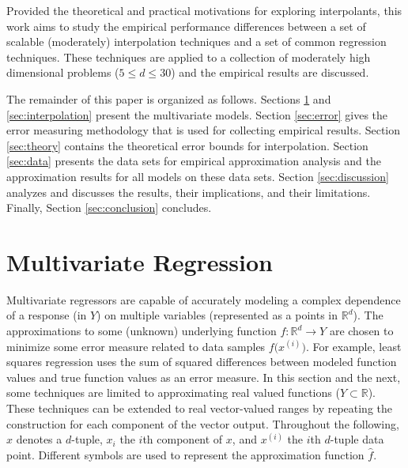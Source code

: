 \documentclass[smallextended,final]{svjour3}       %
\begin{document}
Provided the theoretical and practical motivations for exploring
interpolants, this work aims to study the empirical performance differences
between a set of scalable (moderately) interpolation techniques and a set
of common regression techniques. These techniques are applied to a collection
of moderately high dimensional problems ($5 \le d \le 30$) and the empirical
results are discussed.

The remainder of this paper is organized as follows. Sections
\ref{sec:regression} and \ref{sec:interpolation} present the multivariate
models. Section \ref{sec:error} gives the error measuring methodology
that is used for collecting empirical results. Section \ref{sec:theory}
contains the theoretical error bounds for interpolation. Section
\ref{sec:data} presents the data sets for empirical approximation analysis
and the approximation results for all models on these data sets.
Section \ref{sec:discussion} analyzes and discusses the results, their
implications, and their limitations. Finally, Section \ref{sec:conclusion}
concludes.



\section{Multivariate Regression}
\label{sec:regression}
Multivariate regressors are capable of accurately modeling a complex dependence of a response (in $Y$) on multiple variables (represented as a points in $\mathbb{R}^{d}$). The approximations to some (unknown) underlying function $f: \mathbb{R}^d \rightarrow Y$ are chosen to minimize some error measure related to data samples $f\bigl(x^{(i)}\bigr)$. For example, least squares regression uses the sum of squared differences between modeled function values and true function values as an error measure. In this section and the next, some techniques are limited to approximating real valued functions ($Y \subset \mathbb{R}$). These techniques can be extended to real vector-valued ranges by repeating the construction for each component of the vector output. Throughout the following, $x$ denotes a $d$-tuple, $x_i$ the $i$th component of $x$, and $x^{(i)}$ the $i$th $d$-tuple data point. Different symbols are used to represent the approximation function $\hat f$.
\end{document}
